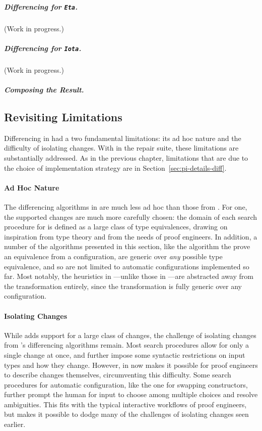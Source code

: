 \subparagraph*{Differencing for \lstinline{Eta}.} (Work in progress.)

\subparagraph*{Differencing for \lstinline{Iota}.} (Work in progress.)

\subparagraph*{Composing the Result.} %
\fi

\subsection{Revisiting Limitations}
\label{sec:pi-diff-limits}

Differencing in \sysname had a two fundamental limitations: its ad hoc nature
and the difficulty of isolating changes.
With \toolnamec in the \sysnamelong repair suite, these limitations are substantially addressed.
As in the previous chapter, limitations that are due to the choice of implementation strategy are in Section~\ref{sec:pi-details-diff}.

\paragraph{Ad Hoc Nature}
The differencing algorithms in \toolnamec are much less ad hoc than those from \sysname.
For one, the supported changes are much more carefully chosen:
the domain of each search procedure for  is defined as a large class of type equivalences,
drawing on inspiration from type theory and from the needs of proof engineers.
In addition, a number of the algorithms presented in this section, like the algorithm the prove an equivalence from a configuration,
are generic over \textit{any} possible type equivalence, and so are not limited to automatic configurations implemented so far.
Most notably, the heuristics in \toolnamec---unlike those in \sysname---are abstracted away from the transformation entirely,
since the transformation is fully generic over any configuration.

\paragraph{Isolating Changes}
While \toolnamec adds support for a large class of changes,
the challenge of isolating changes from \sysname's differencing algorithms remain.
Most search procedures allow for only a single change at once,
and further impose some syntactic restrictions on input types and how they change.
However,  in \toolnamec now makes it possible for proof engineers to describe
changes themselves, circumventing this difficulty.
Some search procedures for automatic configuration, like the one for swapping constructors,
further prompt the human for input to choose among multiple choices and resolve ambiguities.
This fits with the typical interactive workflows of proof engineers,
but makes it possible to dodge many of the challenges of isolating changes seen earlier.

